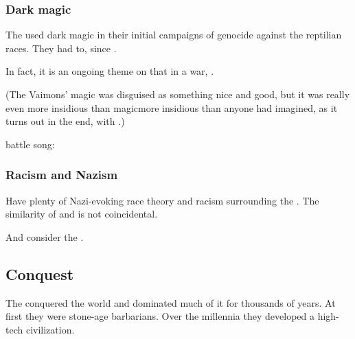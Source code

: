 \subsubsection{Dark magic}
The \aryothim used dark magic in their initial campaigns of genocide against the reptilian races.
They had to, since . 

In fact, it is an ongoing theme on \Miith that in a war, . 

(The Vaimons' magic was disguised as something nice and good, but it was really even more insidious than \xs magic\dash{}more insidious than anyone had imagined, as it turns out in the end, with \Lithrim.)

\Aryoth battle song:





\subsubsection{Racism and Nazism}
Have plenty of Nazi-evoking race theory and racism surrounding the \aryothim. 
The similarity of \quo{\aryoth} and  is not coincidental. 

And consider the . 










\subsection{Conquest}
The \aryothim conquered the world and dominated much of it for thousands of years.
At first they were stone-age barbarians.
Over the millennia they developed a high-tech civilization.

